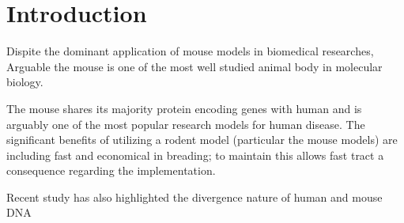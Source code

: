 \section{Introduction}

Dispite the dominant application of mouse models in biomedical researches, Arguable the mouse is one of the most well studied animal body in molecular biology. 

The mouse shares its majority protein encoding genes with human and is arguably one of the most popular research models for human disease. The significant benefits of utilizing a rodent model (particular the mouse models) are including fast and economical in breading; to maintain this allows fast tract a consequence regarding the implementation. \cite{Vandamme_2014}

Recent study has also highlighted the divergence nature of human and mouse DNA 